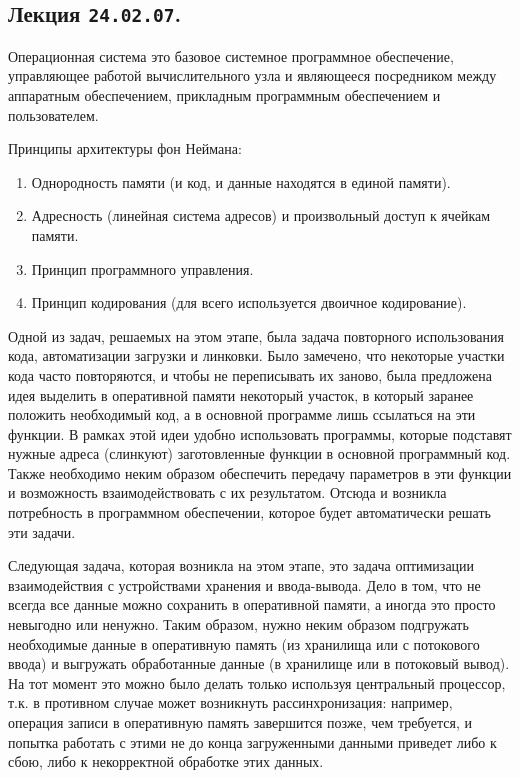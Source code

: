 \subsection{%
  Лекция \texttt{24.02.07}.%
}


\begin{definition}
  Операционная система это базовое системное программное обеспечение,
  управляющее работой вычислительного узла и являющееся посредником между
  аппаратным обеспечением, прикладным программным обеспечением и пользователем.
\end{definition}

Принципы архитектуры фон Неймана:

\begin{enumerate}
\item
  Однородность памяти (и код, и данные находятся в единой памяти).

\item
  Адресность (линейная система адресов) и произвольный доступ к ячейкам памяти.

\item
  Принцип программного управления.

\item
  Принцип кодирования (для всего используется двоичное кодирование).
\end{enumerate}


Одной из задач, решаемых на этом этапе, была задача повторного использования
кода, автоматизации загрузки и линковки. Было замечено, что некоторые участки
кода часто повторяются, и чтобы не переписывать их заново, была предложена идея
выделить в оперативной памяти некоторый участок, в который заранее положить
необходимый код, а в основной программе лишь ссылаться на эти функции. В рамках
этой идеи удобно использовать программы, которые подставят нужные адреса
(слинкуют) заготовленные функции в основной программный код. Также необходимо
неким образом обеспечить передачу параметров в эти функции и возможность
взаимодействовать с их результатом. Отсюда и возникла потребность в программном
обеспечении, которое будет автоматически решать эти задачи.

Следующая задача, которая возникла на этом этапе, это задача оптимизации
взаимодействия с устройствами хранения и ввода-вывода. Дело в том, что не всегда
все данные можно сохранить в оперативной памяти, а иногда это просто невыгодно
или ненужно. Таким образом, нужно неким образом подгружать необходимые данные в
оперативную память (из хранилища или с потокового ввода) и выгружать
обработанные данные (в хранилище или в потоковый вывод). На тот момент это можно
было делать только используя центральный процессор, т.к. в противном случае
может возникнуть рассинхронизация: например, операция записи в оперативную
память завершится позже, чем требуется, и попытка работать с этими не до конца
загруженными данными приведет либо к сбою, либо к некорректной обработке этих
данных.

